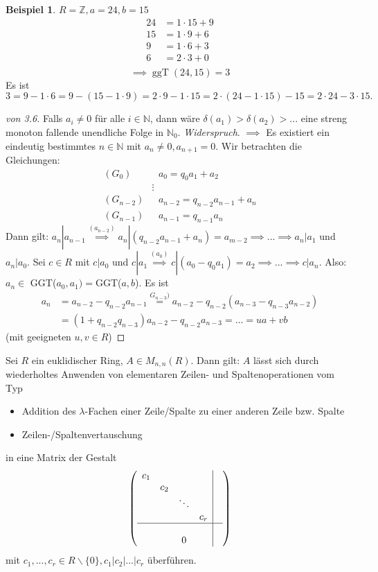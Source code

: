 \documentclass[a4paper, titlepage]{article}
\theoremstyle{definition}
\newtheorem{bsp}[satz]{Beispiel}
\newcommand{\N}{\mathbb{N}}
\newcommand{\Z}{\mathbb{Z}}
\begin{document}
\begin{bsp}
    $R=\Z, a=24, b=15$
    \begin{align*}
        24&=1\cdot 15+9\\
        15&=1\cdot 9+6\\
        9&=1\cdot 6 +3\\
        6&=2\cdot 3 +0\\
    \end{align*}
$$\implies \operatorname{ggT}(24,15)=3$$
    Es ist $$3=9-1\cdot 6=9-(15-1\cdot 9)=2\cdot 9 - 1\cdot 15 = 2\cdot(24-1\cdot 15)-15=2\cdot 24-3\cdot 15.$$
\end{bsp}
\begin{proof}[von 3.6]
    Falls $a_i\neq 0$ für alle $i \in \N$, dann wäre $\delta(a_1)>\delta(a_2)> ... $ eine streng monoton fallende unendliche Folge in $\N_0$. \textit{Widerspruch}.
    $\implies$ Es existiert ein eindeutig bestimmtes $n\in\N$ mit $a_n\neq 0,a_{n+1}=0$. 
    Wir betrachten die Gleichungen: 
    \begin{align*}
        (G_0)&\text{ }a_0= q_0a_1+a_2\\
        &\vdots\\
        (G_{n-2})&\text{ } a_{n-2}=q_{n-2}a_{n-1}+a_n\\
        (G_{n-1})&\text{ } a_{n-1}=q_{n-1}a_n
    \end{align*}
    Dann gilt: $a_n|a_{n-1}\overset{(a_{n-2})}{\implies} a_n|(q_{n-2}a_{n-1}+a_n)=a_{m-2}\implies ... \implies a_n|a_1 $ und $ a_n|a_0$.
    Sei $c\in R$ mit $c|a_0$ und $c|a_1\overset{(a_0)}{\implies} c|(a_0-q_0a_1)=a_2\implies ... \implies c|a_n$. 
    Also: $a_n\in $ GGT($a_0,a_1)=$GGT($a,b$). Es ist 
    \begin{align*}
        a_n&=a_{n-2}-q_{n-2}a_{n-1}\overset{G_{n-3})}{=} a_{n-2}-q_{n-2}(a_{n-3}-q_{n-3}a_{n-2})\\
        &=(1+q_{n-2}q_{n-3})a_{n-2}-q_{n-2}a_{n-3}=...=ua+vb
    \end{align*}
    (mit geeigneten $u,v\in R$)
\end{proof}
\begin{satz}
    Sei $R$ ein euklidischer Ring, $A\in M_{n,n}(R)$. 
    Dann gilt: $A$ lässt sich durch wiederholtes Anwenden von elementaren Zeilen- und Spaltenoperationen vom Typ
    \begin{itemize}
        \item Addition des $\lambda$-Fachen einer Zeile/Spalte zu einer anderen Zeile bzw. Spalte 
        \item Zeilen-/Spaltenvertauschung
    \end{itemize}
in eine Matrix der Gestalt 
$$\left(\begin{array}{cccc|c}
    c_1& & & & \\
    & c_2& & &  \\  
    & & \ddots& & \\
    & & & c_r& \\
    \hline & & & & \\
    & & 0& & \\
\end{array}\right)$$
mit $c_1,...,c_r\in R\backslash \{0\}, c_1|c_2|...|c_r$ überführen.
\end{satz}
\end{document}
